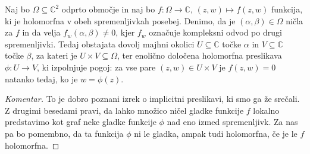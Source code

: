 \documentclass[mat1]{fmfdelo}
\numberwithin{equation}{section}
\newcommand{\C}{\mathbb C}
\theoremstyle{definition}
\newenvironment{komentar}[1][Komentar]{\begin{proof}[#1]\let\qed\relax}{\end{proof}}
\begin{document}
\begin{izrek}
    \label{izrek o impliclitni preslikavi}
    Naj bo $\Omega \subseteq \C^2$ odprto območje in naj bo $f : \Omega \to \C$, $(z, w) \mapsto f(z,w)$ funkcija, ki je holomorfna v obeh spremenljivkah posebej. Denimo, da je $(\alpha, \beta) \in \Omega$ ničla za $f$ in da velja $f_w(\alpha, \beta) \neq 0$, kjer $f_w$ označuje kompleksni odvod po drugi spremenljivki. Tedaj obstajata dovolj majhni okolici $U \subseteq \C$ točke $\alpha$ in $V \subseteq \C$ točke $\beta$, za kateri je $U \times V \subseteq \Omega$, ter enolično določena holomorfna preslikava $\phi : U \to V$, ki izpolnjuje pogoj: 
    za vse pare $(z, w) \in U \times V$ je $f(z,w) = 0$ natanko tedaj, ko je $w = \phi(z)$.

    
    

\end{izrek}

\begin{komentar}
    To je dobro poznani izrek o implicitni preslikavi, ki smo ga že srečali. Z drugimi besedami pravi, da lahko množico ničel gladke funkcije $f$ lokalno predstavimo kot graf neke gladke funkcije $\phi$ nad eno izmed spremenljivk. Za nas pa bo pomembno, da ta funkcija $\phi$ ni le gladka, ampak tudi holomorfna, če je le $f$ holomorfna. 
\end{komentar}
\end{document}
